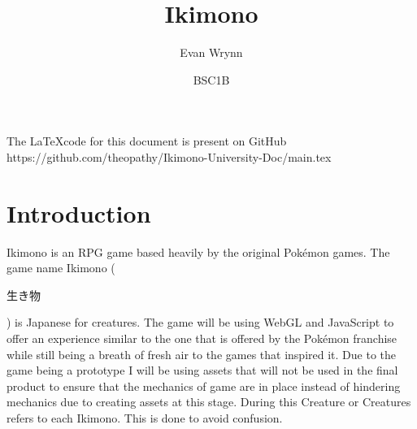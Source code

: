 \documentclass[11pt,a4paper]{article}
\title{Ikimono}
\author{Evan Wrynn }
\date{BSC1B}
\begin{document}
\maketitle
\begin{center}
The \LaTeX\space code for this document is present on GitHub \\
https://github.com/theopathy/Ikimono-University-Doc/main.tex
\end{center}
\section{Introduction} 
Ikimono is an RPG game based heavily by the original Pokémon games. The game name Ikimono ( \begin{CJK}{UTF8}{min}生き物\end{CJK} ) is Japanese for creatures. The game will be using WebGL and JavaScript to offer an experience similar to the one that is offered by the Pokémon franchise while still being a breath of fresh air to the games that inspired it. Due to the game being a prototype I will be using assets that will not be used in the final product to ensure that the mechanics of game are in place instead of hindering mechanics due to creating assets at this stage. During this Creature or Creatures refers to each Ikimono. This is done to avoid confusion.
\end{document}
